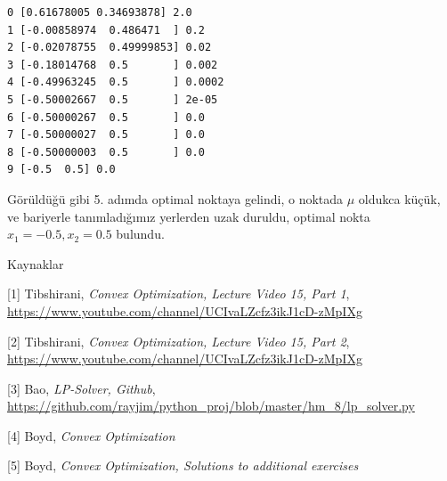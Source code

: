 \documentclass[12pt,fleqn]{article}\usepackage{../../common}
\begin{document}
\begin{verbatim}
0 [0.61678005 0.34693878] 2.0
1 [-0.00858974  0.486471  ] 0.2
2 [-0.02078755  0.49999853] 0.02
3 [-0.18014768  0.5       ] 0.002
4 [-0.49963245  0.5       ] 0.0002
5 [-0.50002667  0.5       ] 2e-05
6 [-0.50000267  0.5       ] 0.0
7 [-0.50000027  0.5       ] 0.0
8 [-0.50000003  0.5       ] 0.0
9 [-0.5  0.5] 0.0
\end{verbatim}

Görüldüğü gibi 5. adımda optimal noktaya gelindi, o noktada $\mu$
oldukca küçük, ve bariyerle tanımladığımız yerlerden uzak duruldu,
optimal nokta $x_1=-0.5,x_2=0.5$ bulundu.


Kaynaklar

[1] Tibshirani, 
    {\em Convex Optimization, Lecture Video 15, Part 1}, 
    \url{https://www.youtube.com/channel/UCIvaLZcfz3ikJ1cD-zMpIXg}   

[2] Tibshirani, 
    {\em Convex Optimization, Lecture Video 15, Part 2}, 
    \url{https://www.youtube.com/channel/UCIvaLZcfz3ikJ1cD-zMpIXg}   

[3] Bao, {\em LP-Solver, Github}, 
    \url{https://github.com/rayjim/python_proj/blob/master/hm_8/lp_solver.py}

[4] Boyd, {\em Convex Optimization}

[5] Boyd, {\em Convex Optimization, Solutions to additional exercises}
\end{document}
